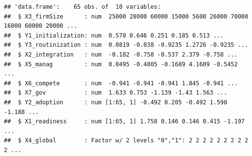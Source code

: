 \documentclass[
]{article}
\newenvironment{Shaded}{\begin{snugshade}}{\end{snugshade}}
\newcommand{\CommentTok}[1]{\textcolor[rgb]{0.56,0.35,0.01}{\textit{#1}}}
\newcommand{\ControlFlowTok}[1]{\textcolor[rgb]{0.13,0.29,0.53}{\textbf{#1}}}
\newcommand{\DecValTok}[1]{\textcolor[rgb]{0.00,0.00,0.81}{#1}}
\newcommand{\KeywordTok}[1]{\textcolor[rgb]{0.13,0.29,0.53}{\textbf{#1}}}
\newcommand{\NormalTok}[1]{#1}
\newcommand{\OperatorTok}[1]{\textcolor[rgb]{0.81,0.36,0.00}{\textbf{#1}}}
\newcommand{\StringTok}[1]{\textcolor[rgb]{0.31,0.60,0.02}{#1}}
\begin{document}
\begin{Shaded}
\end{Shaded}

\begin{verbatim}
## 'data.frame':    65 obs. of  10 variables:
##  $ X3_firmSize      : num  25000 28000 60000 15000 5600 26000 70000 16000 60000 20000 ...
##  $ Y1_initialization: num  0.578 0.646 0.251 0.185 0.513 ...
##  $ Y3_routinization : num  0.0819 -0.038 -0.9235 1.2726 -0.9235 ...
##  $ X2_integration   : num  -0.182 -0.758 -0.537 2.379 -0.758 ...
##  $ X5_manag         : num  0.0495 -0.4805 -0.1689 4.1609 -0.5452 ...
##  $ X6_compete       : num  -0.941 -0.941 -0.941 1.845 -0.941 ...
##  $ X7_gov           : num  1.633 0.753 -1.139 -1.43 1.563 ...
##  $ Y2_adoption      : num [1:65, 1] -0.492 0.205 -0.492 1.598 -1.188 ...
##  $ X1_readiness     : num [1:65, 1] 1.758 0.146 0.146 0.415 -1.197 ...
##  $ X4_global        : Factor w/ 2 levels "0","1": 2 2 2 2 2 2 2 2 2 2 ...
\end{verbatim}

\begin{Shaded}
\end{Shaded}
\end{document}
